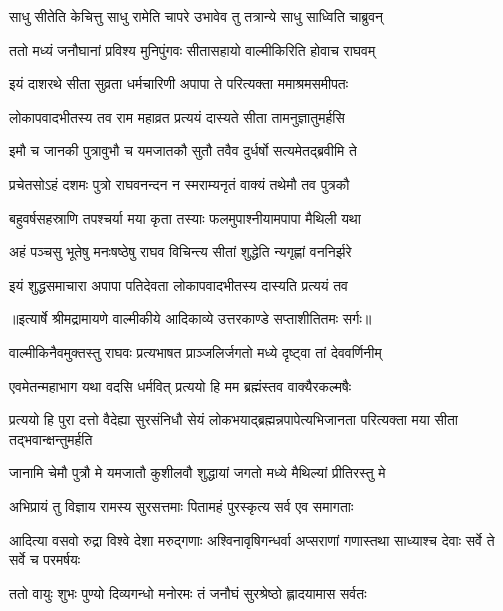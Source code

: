 \twolineshloka
{साधु सीतेति केचित्तु साधु रामेति चापरे}
{उभावेव तु तत्रान्ये साधु साध्विति चाब्रुवन्} %

\twolineshloka
{ततो मध्यं जनौघानां प्रविश्य मुनिपुंगवः}
{सीतासहायो वाल्मीकिरिति होवाच राघवम्} %

\twolineshloka
{इयं दाशरथे सीता सुव्रता धर्मचारिणी}
{अपापा ते परित्यक्ता ममाश्रमसमीपतः} %

\twolineshloka
{लोकापवादभीतस्य तव राम महाव्रत}
{प्रत्ययं दास्यते सीता तामनुज्ञातुमर्हसि} %

\twolineshloka
{इमौ च जानकी पुत्रावुभौ च यमजातकौ}
{सुतौ तवैव दुर्धर्षो सत्यमेतद्ब्रवीमि ते} %

\twolineshloka
{प्रचेतसोऽहं दशमः पुत्रो राघवनन्दन}
{न स्मराम्यनृतं वाक्यं तथेमौ तव पुत्रकौ} %

\twolineshloka
{बहुवर्षसहस्राणि तपश्चर्या मया कृता}
{तस्याः फलमुपाश्नीयामपापा मैथिली यथा} %

\twolineshloka
{अहं पञ्चसु भूतेषु मनःषष्ठेषु राघव}
{विचिन्त्य सीतां शुद्धेति न्यगृह्णां वननिर्झरे} %

\twolineshloka
{इयं शुद्धसमाचारा अपापा पतिदेवता}
{लोकापवादभीतस्य दास्यति प्रत्ययं तव} %


{॥इत्यार्षे श्रीमद्रामायणे वाल्मीकीये आदिकाव्ये उत्तरकाण्डे सप्ताशीतितमः सर्गः॥}


\twolineshloka
{वाल्मीकिनैवमुक्तस्तु राघवः प्रत्यभाषत}
{प्राञ्जलिर्जगतो मध्ये दृष्ट्वा तां देववर्णिनीम्} %

\twolineshloka
{एवमेतन्महाभाग यथा वदसि धर्मवित्}
{प्रत्ययो हि मम ब्रह्मंस्तव वाक्यैरकल्मषैः} %

\threelineshloka
{प्रत्ययो हि पुरा दत्तो वैदेह्या सुरसंनिधौ}
{सेयं लोकभयाद्ब्रह्मन्नपापेत्यभिजानता}
{परित्यक्ता मया सीता तद्भवान्क्षन्तुमर्हति} %

\twolineshloka
{जानामि चेमौ पुत्रौ मे यमजातौ कुशीलवौ}
{शुद्धायां जगतो मध्ये मैथिल्यां प्रीतिरस्तु मे} %

\twolineshloka
{अभिप्रायं तु विज्ञाय रामस्य सुरसत्तमाः}
{पितामहं पुरस्कृत्य सर्व एव समागताः} %

\threelineshloka
{आदित्या वसवो रुद्रा विश्वे देशा मरुद्गणाः}
{अश्विनावृषिगन्धर्वा अप्सराणां गणास्तथा}
{साध्याश्च देवाः सर्वे ते सर्वे च परमर्षयः} %

\twolineshloka
{ततो वायुः शुभः पुण्यो दिव्यगन्धो मनोरमः}
{तं जनौघं सुरश्रेष्ठो ह्लादयामास सर्वतः} %

